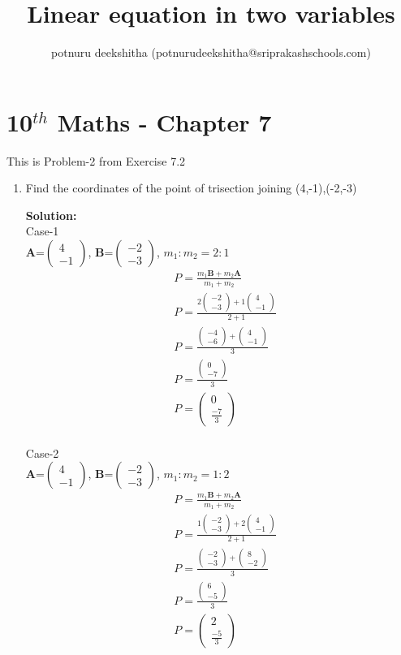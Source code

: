 \documentclass[12pt]{article}
\title{Linear equation in two variables}
\author{potnuru deekshitha (potnurudeekshitha@sriprakashschools.com)}
\newcommand{\myvec}[1]{\ensuremath{\begin{pmatrix}#1\end{pmatrix}}}
\newcommand{\solution}{\noindent \textbf{Solution: }}
\let\vec\mathbf
\begin{document}
\maketitle
\section*{10$^{th}$ Maths - Chapter 7}
This is Problem-2 from Exercise 7.2
\begin{enumerate}
\item  Find the coordinates of the point of trisection joining (4,-1),(-2,-3)

\solution\\
Case-1\\
$\vec{A}$=\myvec{4\\-1}, $\vec{B}$=\myvec{-2\\-3},
$m_1:m_2=2:1$
\begin{align}
&P=\frac{m_1\vec{B}+m_2\vec{A}}{m_1+m_2}\\
&P=\frac{2\myvec{-2\\-3}+1\myvec{4\\-1}}{2+1}\\
&P=\frac{\myvec{-4\\-6}+\myvec{4\\-1}}{3}\\
&P=\frac{\myvec{0\\-7}}{3}\\
&P=\myvec{0\\\frac{-7}{3}}\\
\end{align}

Case-2\\
$\vec{A}$=\myvec{4\\-1}, $\vec{B}$=\myvec{-2\\-3},
$m_1:m_2=1:2$
\begin{align}
&P=\frac{m_1\vec{B}+m_2\vec{A}}{m_1+m_2}\\
&P=\frac{1\myvec{-2\\-3}+2\myvec{4\\-1}}{2+1}\\
&P=\frac{\myvec{-2\\-3}+\myvec{8\\-2}}{3}\\
&P=\frac{\myvec{6\\-5}}{3}\\
&P=\myvec{2\\\frac{-5}{3}}\\
\end{align}



\end{enumerate}
\end{document}

